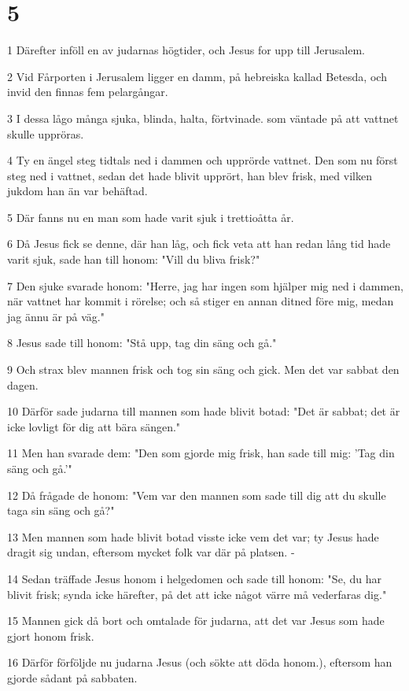 \chapter{5}

\par 1 Därefter inföll en av judarnas högtider, och Jesus for upp till Jerusalem.
\par 2 Vid Fårporten i Jerusalem ligger en damm, på hebreiska kallad Betesda, och invid den finnas fem pelargångar.
\par 3 I dessa lågo många sjuka, blinda, halta, förtvinade. som väntade på att vattnet skulle uppröras.
\par 4 Ty en ängel steg tidtals ned i dammen och upprörde vattnet. Den som nu först steg ned i vattnet, sedan det hade blivit upprört, han blev frisk, med vilken jukdom han än var behäftad.
\par 5 Där fanns nu en man som hade varit sjuk i trettioåtta år.
\par 6 Då Jesus fick se denne, där han låg, och fick veta att han redan lång tid hade varit sjuk, sade han till honom: "Vill du bliva frisk?"
\par 7 Den sjuke svarade honom: "Herre, jag har ingen som hjälper mig ned i dammen, när vattnet har kommit i rörelse; och så stiger en annan ditned före mig, medan jag ännu är på väg."
\par 8 Jesus sade till honom: "Stå upp, tag din säng och gå."
\par 9 Och strax blev mannen frisk och tog sin säng och gick. Men det var sabbat den dagen.
\par 10 Därför sade judarna till mannen som hade blivit botad: "Det är sabbat; det är icke lovligt för dig att bära sängen."
\par 11 Men han svarade dem: "Den som gjorde mig frisk, han sade till mig: 'Tag din säng och gå.'"
\par 12 Då frågade de honom: "Vem var den mannen som sade till dig att du skulle taga sin säng och gå?"
\par 13 Men mannen som hade blivit botad visste icke vem det var; ty Jesus hade dragit sig undan, eftersom mycket folk var där på platsen. -
\par 14 Sedan träffade Jesus honom i helgedomen och sade till honom: "Se, du har blivit frisk; synda icke härefter, på det att icke något värre må vederfaras dig."
\par 15 Mannen gick då bort och omtalade för judarna, att det var Jesus som hade gjort honom frisk.
\par 16 Därför förföljde nu judarna Jesus (och sökte att döda honom.), eftersom han gjorde sådant på sabbaten.
